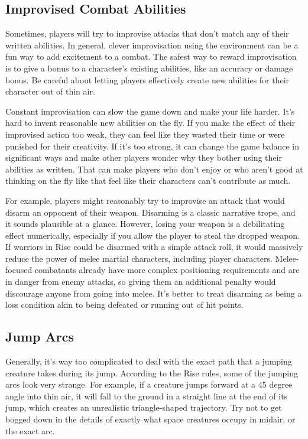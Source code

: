   \subsection{Improvised Combat Abilities}
    Sometimes, players will try to improvise attacks that don't match any of their written abilities.
    In general, clever improvisation using the environment can be a fun way to add excitement to a combat.
    The safest way to reward improvisation is to give a bonus to a character's existing abilities, like an accuracy or damage bonus.
    Be careful about letting players effectively create new abilities for their character out of thin air.

    Constant improvisation can slow the game down and make your life harder.
    It's hard to invent reasonable new abilities on the fly.
    If you make the effect of their improvised action too weak, they can feel like they wasted their time or were punished for their creativity.
    If it's too strong, it can change the game balance in significant ways and make other players wonder why they bother using their abilities as written.
    That can make players who don't enjoy or who aren't good at thinking on the fly like that feel like their characters can't contribute as much.

    For example, players might reasonably try to improvise an attack that would disarm an opponent of their weapon.
    Disarming is a classic narrative trope, and it sounds plausible at a glance.
    However, losing your weapon is a debilitating effect numerically, especially if you allow the player to steal the dropped weapon.
    If warriors in Rise could be disarmed with a simple attack roll, it would massively reduce the power of melee martial characters, including player characters.
    Melee-focused combatants already have more complex positioning requirements and are in danger from enemy attacks, so giving them an additional penalty would discourage anyone from going into melee.
    It's better to treat disarming as being a loss condition akin to being defeated or running out of hit points.

  \subsection{Jump Arcs}
    Generally, it's way too complicated to deal with the exact path that a jumping creature takes during its jump.
    According to the Rise rules, some of the jumping arcs look very strange.
    For example, if a creature jumps forward at a 45 degree angle into thin air, it will fall to the ground in a straight line at the end of its jump, which creates an unrealistic triangle-shaped trajectory.
    Try not to get bogged down in the details of exactly what space creatures occupy in midair, or the exact arc.

